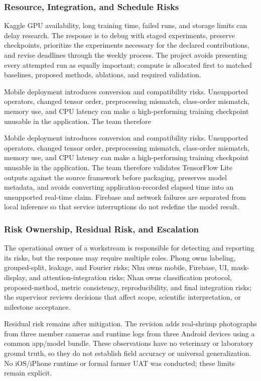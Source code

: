 \documentclass[12pt,a4paper]{report}
\begin{document}
\subsubsection{Resource, Integration, and Schedule Risks}
Kaggle GPU availability, long training time, failed runs, and storage limits can delay research. The response is to debug with staged experiments, preserve checkpoints, prioritize the experiments necessary for the declared contributions, and revise deadlines through the weekly process. The project avoids presenting every attempted run as equally important; compute is allocated first to matched baselines, proposed methods, ablations, and required validation.\par
Mobile deployment introduces conversion and compatibility risks. Unsupported operators, changed tensor order, preprocessing mismatch, class-order mismatch, memory use, and CPU latency can make a high-performing training checkpoint unusable in the application. The team therefore\par
Mobile deployment introduces conversion and compatibility risks. Unsupported operators, changed tensor order, preprocessing mismatch, class-order mismatch, memory use, and CPU latency can make a high-performing training checkpoint unusable in the application. The team therefore validates TensorFlow Lite outputs against the source framework before packaging, preserves model metadata, and avoids converting application-recorded elapsed time into an unsupported real-time claim. Firebase and network failures are separated from local inference so that service interruptions do not redefine the model result.\par
\subsubsection{Risk Ownership, Residual Risk, and Escalation}
The operational owner of a workstream is responsible for detecting and reporting its risks, but the response may require multiple roles. Phong owns labeling, grouped-split, leakage, and Fourier risks; Nhu owns mobile, Firebase, UI, mask-display, and attention-integration risks; Nhan owns classification protocol, proposed-method, metric consistency, reproducibility, and final integration risks; the supervisor reviews decisions that affect scope, scientific interpretation, or milestone acceptance.\par
Residual risk remains after mitigation. The revision adds real-shrimp photographs from three member cameras and runtime logs from three Android devices using a common app/model bundle. These observations have no veterinary or laboratory ground truth, so they do not establish field accuracy or universal generalization. No iOS/iPhone runtime or formal farmer UAT was conducted; these limits remain explicit.\par
\end{document}
